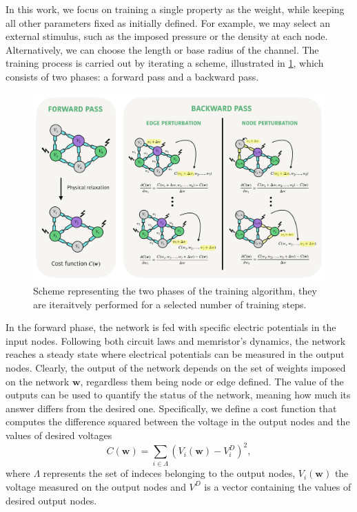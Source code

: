 \documentclass[reprint,superscriptaddress,prb,showkeys]{revtex4-2}
\newcommand{\brac}[1]{\left(#1 \right)} %
\begin{document}
In this work, we focus on training a single property as the weight, while keeping all other parameters fixed as initially defined. For example, we may select an external stimulus, such as the imposed pressure or the density at each node. Alternatively, we can choose the length or base radius of the channel. The training process is carried out by iterating a scheme, illustrated in \cref{fig:training_scheme}, which consists of two phases: a forward pass and a backward pass.
\begin{figure}[t] 
    \centering
    \includegraphics[width=\textwidth]{plots/training/training_scheme.pdf}
    \caption{Scheme representing the two phases of the training algorithm, they are iteraitvely performed for a selected number of training steps.}
    \label{fig:training_scheme}
\end{figure}
In the forward phase, the network is fed with specific electric potentials in the input nodes. Following both circuit laws and memristor's dynamics, the network reaches a steady state where electrical potentials can be measured in the output nodes. Clearly, the output of the network depends on the set of weights imposed on the network $\boldsymbol{w}$, regardless them being node or edge defined. The value of the outputs can be used to quantify the status of the network, meaning how much its answer differs from the desired one. Specifically, we define a cost function that computes the difference squared between the voltage in the output nodes and the values of desired voltages
\[
C\left( \boldsymbol{w} \right) = \sum_{i \in \Lambda} \brac{V_i\brac{\boldsymbol{w}} - V_i^D}^2,
\label{eq:cost_func}
\]
where $\Lambda$ represents the set of indeces belonging to the output nodes, $V_i\brac{\boldsymbol{w}}$ the voltage measured on the output nodes and $V^D$ is a vector containing the values of desired output nodes.
\end{document}
